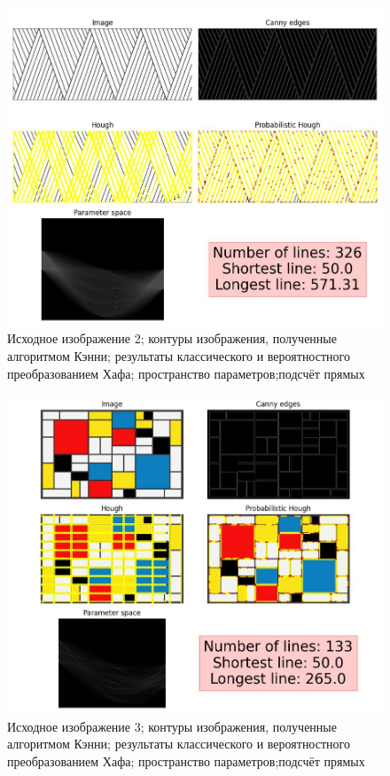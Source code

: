 \begin{figure}[ht!]
    \centering
    \includegraphics[width=\textwidth]{images/lines/simple_lines.jpg}
    \caption{Исходное изображение 2; контуры изображения, полученные алгоритмом Кэнни; результаты классического и вероятностного преобразованием Хафа; пространство параметров;подсчёт прямых}
    \label{img:fin_fir}
\end{figure}

\begin{figure}[ht!]
    \centering
    \includegraphics[width=\textwidth]{images/lines/Mondrian_03.jpg}
    \caption{Исходное изображение 3; контуры изображения, полученные алгоритмом Кэнни; результаты классического и вероятностного преобразованием Хафа; пространство параметров;подсчёт прямых}
    \label{img:fin_piet}
\end{figure}

